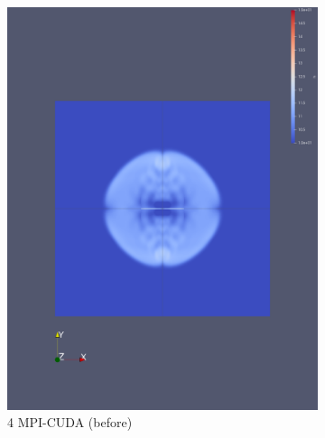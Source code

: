 \documentclass[article]{scrartcl}
\begin{document}
\begin{figure}[htpb]
\begin{subfigure}{.3\textwidth}
    \includegraphics[width=\textwidth,keepaspectratio=true]{../figs/1_validation_cuda_original_4mpi.png}
    \caption{4 MPI-CUDA (before)}
    \label{fig:1mpi-cuda-original}
    \end{subfigure}
%
    \begin{subfigure}{.3\textwidth}
    \centering

\end{subfigure}
\end{figure}
\end{document}
